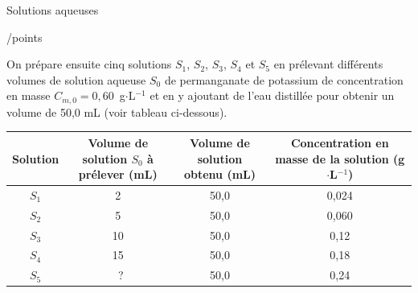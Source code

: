 \begin{doc}{Solutions aqueuses \begin{Large}
    /points
\end{Large}}
On prépare ensuite cinq solutions $S_1$, $S_2$, $S_3$, $S_4$ et $S_5$ en prélevant différents volumes de solution aqueuse $S_0$ de permanganate de potassium de concentration en masse $C_{m,0} = 0,60$~g$\cdot$L$^{-1}$ et en y ajoutant de l’eau distillée pour obtenir un volume de 50,0 mL (voir tableau ci-dessous).
\begin{center}
    \begin{tabular}{|C{0.1}|C{0.2}|C{0.2}|C{0.2}|}
        \hline
        Solution & Volume de solution $S_0$ à prélever (mL) & Volume de solution obtenu (mL) & Concentration en masse de la solution (g$\cdot$L$^{-1}$) \\
        \hline 
        $S_1$ & 2 & 50,0 & 0,024 \\
        \hline
        $S_2$ & 5 & 50,0 & 0,060 \\
        \hline
        $S_3$ & 10 & 50,0 & 0,12 \\
        \hline
        $S_4$ & 15 & 50,0 & 0,18 \\
        \hline
        $S_5$ & ~? & 50,0 & 0,24 \\
        \hline
    \end{tabular}
\end{center}


\end{doc}

